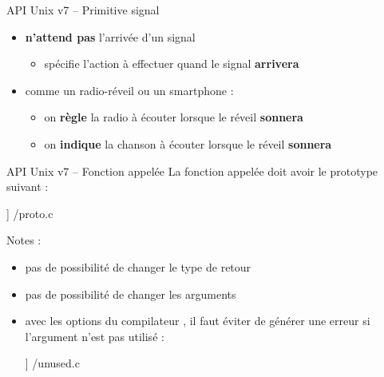 \begin {frame} {API Unix v7 -- Primitive signal}
    \begin {block} {}
    \begin {itemize}
	\item {} \textbf {n'attend pas} l'arrivée d'un signal
	    \begin {itemize}
		\item {} spécifie l'action à effectuer quand
		    le signal \textbf {arrivera}
	    \end {itemize}
	\item comme un radio-réveil ou un smartphone :
	    \begin {itemize}
		\item on \textbf {règle} la radio à écouter lorsque
		    le réveil \textbf {sonnera}
		\item on \textbf {indique} la chanson à écouter lorsque
		    le réveil \textbf {sonnera}
	    \end {itemize}
    \end {itemize}
    \end {block}
\end {frame}

\begin {frame} {API Unix v7 -- Fonction appelée}
    La fonction appelée doit avoir le prototype suivant :

    \fD\lstmonstyle] {\inc/proto.c}

    Notes :
    \begin {itemize}
	\item pas de possibilité de changer le type de retour
	\item pas de possibilité de changer les arguments

	\item avec les options  du
	    compilateur , il faut éviter de générer une
	    erreur si l'argument n'est pas utilisé :

	    \fD\lstmonstyle] {\inc/unused.c}
    \end {itemize}

\end {frame}

